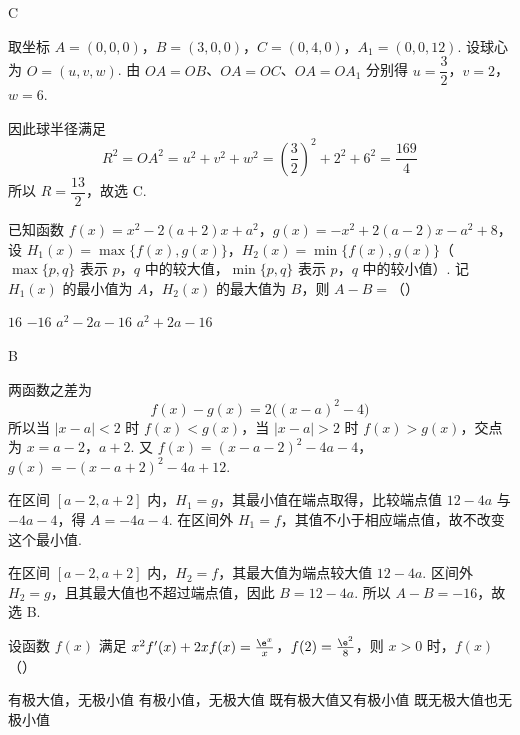 \begin{answer}
C
\end{answer}

\begin{solution}
取坐标 \(A=(0,0,0)\)，\(B=(3,0,0)\)，\(C=(0,4,0)\)，\(A_1=(0,0,12)\). 设球心为 \(O=(u,v,w)\). 由 \(OA=OB\)、\(OA=OC\)、\(OA=OA_1\) 分别得
\(u=\dfrac32\)，\(v=2\)，\(w=6\).

因此球半径满足
\[
R^2=OA^2=u^2+v^2+w^2=\left(\frac32\right)^2+2^2+6^2=\frac{169}{4}
\]
所以 \(R=\dfrac{13}{2}\)，故选 C.
\end{solution}

\begin{problem}
已知函数 \(f(x) = x^2 - 2(a + 2)x + a^2\)，\(g(x) = -x^2 + 2(a - 2)x - a^2 + 8\)，设 \(H_1(x) = \max\{f(x), g(x)\}\)，\(H_2(x) = \min\{f(x), g(x)\}\)（\(\max\{p, q\}\) 表示 \(p\)，\(q\) 中的较大值，\(\min\{p, q\}\) 表示 \(p\)，\(q\) 中的较小值）. 记 \(H_1(x)\) 的最小值为 \(A\)，\(H_2(x)\) 的最大值为 \(B\)，则 \(A - B =\)（\quad）

\choices
    {\(16\)}
    {\(-16\)}
    {\(a^2 - 2a - 16\)}
    {\(a^2 + 2a - 16\)}
\end{problem}

\begin{answer}
B
\end{answer}

\begin{solution}
两函数之差为
\[
f(x)-g(x)=2\bigl((x-a)^2-4\bigr)
\]
所以当 \(\lvert x-a\rvert<2\) 时 \(f(x)<g(x)\)，当 \(\lvert x-a\rvert>2\) 时 \(f(x)>g(x)\)，交点为 \(x=a-2\)，\(a+2\). 又 \(f(x)=(x-a-2)^2-4a-4\)，\(g(x)=-(x-a+2)^2-4a+12\).

在区间 \([a-2,a+2]\) 内，\(H_1=g\)，其最小值在端点取得，比较端点值 \(12-4a\) 与 \(-4a-4\)，得 \(A=-4a-4\). 在区间外 \(H_1=f\)，其值不小于相应端点值，故不改变这个最小值.

在区间 \([a-2,a+2]\) 内，\(H_2=f\)，其最大值为端点较大值 \(12-4a\). 区间外 \(H_2=g\)，且其最大值也不超过端点值，因此 \(B=12-4a\). 所以 \(A-B=-16\)，故选 B.
\end{solution}

\begin{problem}
设函数 \( f(x) \) 满足 \(x^{2}f'(x) + 2xf(x) = \frac{\e^{x}}{x}\)，\(f(2) = \frac{\e^{2}}{8}\)，则 \( x > 0 \) 时，\( f(x) \)（\quad）

\choices
    {有极大值，无极小值}
    {有极小值，无极大值}
    {既有极大值又有极小值}
    {既无极大值也无极小值}
\end{problem}


